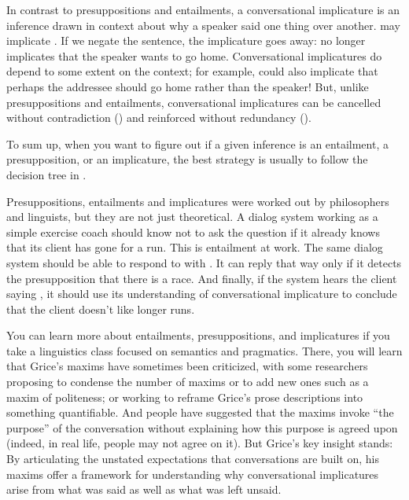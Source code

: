 In contrast to presuppositions and entailments, a conversational implicature is an inference drawn in context about why a speaker said one thing over another.   may implicate .  If we negate the sentence, the implicature goes away:  no longer implicates that the speaker wants to go home.  Conversational implicatures do depend to some extent on the context; for example,  could also implicate that perhaps the addressee should go home rather than the speaker!   But, unlike presuppositions and entailments, conversational implicatures can be cancelled without contradiction () and reinforced without redundancy ().  

To sum up, when you want to figure out if a given inference is an entailment, a presupposition, or an implicature, the best strategy is usually to follow the decision tree in . 



Presuppositions, entailments and implicatures were worked out by philosophers and linguists, but they are not just theoretical. A dialog system working as a simple exercise coach should know not to ask the question  if it already knows  that its client has gone for a run. This is entailment at work. The same dialog system should be able to respond to  with . It can reply that way only if it detects the presupposition that there is a race. And finally, if the system hears the client saying , it should use its understanding of conversational implicature to conclude that the client doesn't like longer runs.

You can learn more about entailments, presuppositions, and implicatures if you take a linguistics class focused on semantics and pragmatics. There, you will learn that Grice's maxims have sometimes been criticized, with some researchers proposing to condense the number of maxims or to add new ones such as a maxim of politeness; or working to reframe Grice's prose descriptions into something quantifiable.  And people have suggested that the maxims invoke ``the purpose'' of the conversation without explaining how this purpose is agreed upon (indeed, in real life, people may not agree on it).  But Grice's key insight stands:   By articulating the unstated expectations that conversations are built on, his maxims offer a framework for understanding why conversational implicatures arise from what was said as well as what was left unsaid. 

